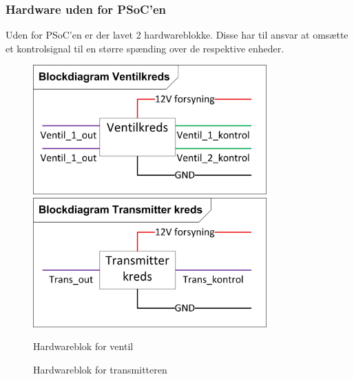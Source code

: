 \subsubsection{Hardware uden for PSoC'en}
Uden for PSoC'en er der lavet 2 hardwareblokke. Disse har til ansvar at omsætte et kontrolsignal til en større spænding over de respektive enheder. 
\begin{figure}[H]
	\centering
	\begin{minipage}[b]{0.48\textwidth}\centering
	\includegraphics[width=0.80\textwidth]{billeder/Ventilblok}
	\end{minipage}
	\begin{minipage}[b]{0.48\textwidth}\centering
	\includegraphics[width=0.80\textwidth]{billeder/Transmitterblok}
	\end{minipage}
	\begin{minipage}[t]{0.48\textwidth}
	\caption{Hardwareblok for ventil}
	\label{fig:Ventilblok1}
	\end{minipage}
	\begin{minipage}[t]{0.48\textwidth}
	\caption{Hardwareblok for transmitteren}
	\label{fig:transmitterblok1}
	\end{minipage}
\end{figure}
